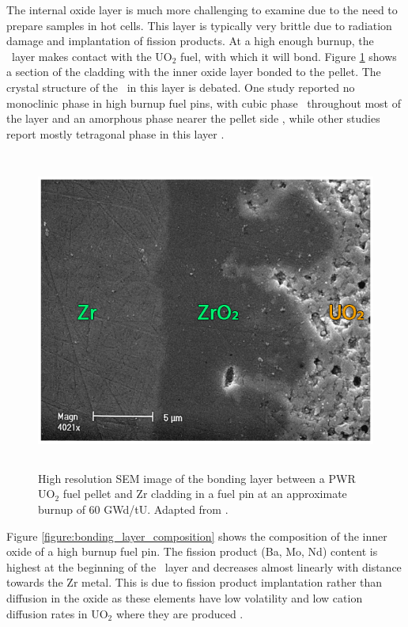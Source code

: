 The internal oxide layer is much more challenging to examine due to the need to prepare samples in hot cells. This layer is typically very brittle due to radiation damage and implantation of fission products. At a high enough burnup, the \zirconia\ layer makes contact with the UO$_{2}$ fuel, with which it will bond. Figure \ref{figure:inner_oxide} shows a section of the cladding with the inner oxide layer bonded to the pellet. The crystal structure of the \zirconia\ in this layer is debated. One study reported no monoclinic phase in high burnup fuel pins, with cubic phase \zirconia\ throughout most of the layer and an amorphous phase nearer the pellet side \cite{Nogita1997}, while other studies report mostly tetragonal phase in this layer \cite{ciszak2017etude, gibert1998influence}. 

\begin{figure}[ht] %
\centering
\includegraphics[height=10.5cm]{images/pci_bondinglayer.png}
\caption[High resolution scanning electron microscrope (SEM) image of the bonding layer between a PWR UO$_{2}$ fuel pellet and Zr cladding in a fuel pin at an approximate burnup of 60 GWd/t U.]{High resolution SEM image of the bonding layer between a PWR UO$_{2}$ fuel pellet and Zr cladding in a fuel pin at an approximate burnup of 60 GWd/tU. Adapted from \cite{Lozano1998}.}
\label{figure:inner_oxide}
\end{figure}

Figure \ref{figure:bonding_layer_composition} shows the composition of the inner oxide of a high burnup fuel pin. The fission product (Ba, Mo, Nd) content is highest at the beginning of the \zirconia\ layer and decreases almost linearly with distance towards the Zr metal. This is due to fission product implantation rather than diffusion in the oxide as these elements have low volatility and low cation diffusion rates in UO$_{2}$ where they are produced \cite{S.G.PrussinD.R.OlanderP.Goubeault1984, Prussin1988}. %

